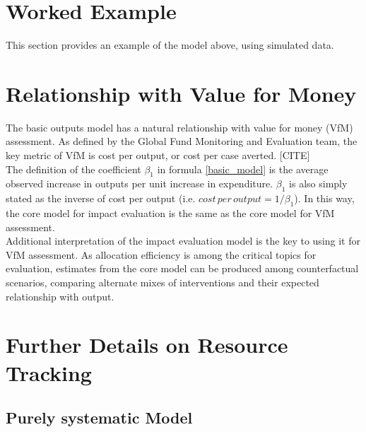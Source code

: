 \documentclass[twocolumn]{bmcart}%
\begin{document}
\section{Worked Example}
This section provides an example of the model above, using simulated data.


\section{Relationship with Value for Money} \label{vfm}
The basic outputs model has a natural relationship with value for money (VfM) assessment. As defined by the Global Fund Monitoring and Evaluation team, the key metric of VfM is cost per output, or cost per case averted. [CITE] \\

The definition of the coefficient $\beta_1$ in formula \ref{basic_model} is the average observed increase in outputs per unit increase in expenditure. $\beta_1$ is also simply stated as the inverse of cost per output (i.e. $cost\, per\, output = 1/\beta_1$). In this way, the core model for impact evaluation is the same as the core model for VfM assessment. \\

Additional interpretation of the impact evaluation model is the key to using it for VfM assessment. As allocation efficiency is among the critical topics for evaluation, estimates from the core model can be produced among counterfactual scenarios, comparing alternate mixes of interventions and their expected relationship with output.\\



\section{Further Details on Resource Tracking} \label{resource_tracking}

\subsection{Purely systematic Model}
\end{document}
